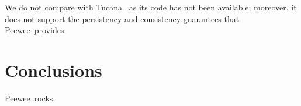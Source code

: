 \documentclass[letterpaper,twocolumn,10pt]{article}
\newcommand{\sys}{Peewee}
\begin{document}
We do not compare with Tucana~\cite{tucana} as its code has not been available; moreover, it does not support the persistency and consistency guarantees that \sys\ provides. 


\section{Conclusions}
\label{sec:conclusions}
\sys\ rocks.

%

{\normalsize 
}


\end{document}
